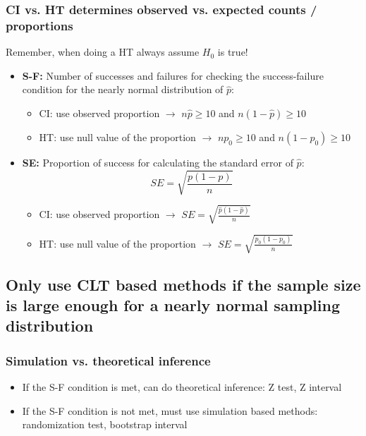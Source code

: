 \documentclass[11pt,containsverbatim,handout,xcolor=xelatex,dvipsnames,table]{beamer}
\begin{document}
\begin{frame}
\frametitle{CI vs. HT determines observed vs. expected counts / proportions}

Remember, when doing a HT always assume $H_0$ is true!
\pause

\begin{itemize}

\item \textbf{S-F:} Number of successes and failures for checking the success-failure condition for the 
nearly normal distribution of $\hat{p}$:
\pause
\begin{itemize}
\item CI: use observed proportion $\rightarrow$ $n\hat{p} \ge 10$ and $n(1 - \hat{p}) \ge 10$
\pause
\item HT: use null value of the proportion $\rightarrow$ $np_0 \ge 10$ and $n(1 - p_0) \ge 10$
\end{itemize}

\pause

\item \textbf{SE:} Proportion of success for calculating the standard error of $\hat{p}$: 
\[ SE = \sqrt{\frac{p(1-p)}{n}} \]
\pause
\vspace{-0.5cm}
\begin{itemize}
\item CI: use observed proportion $\rightarrow$ $SE = \sqrt{\frac{\hat{p}(1-\hat{p})}{n}}$
\pause
\item HT: use null value of the proportion $\rightarrow$ $SE = \sqrt{\frac{p_0(1-p_0)}{n}}$
\end{itemize}

\end{itemize}

\end{frame}


\subsection{Only use CLT based methods if the sample size is large enough for a nearly normal sampling distribution}
\label{mi4}


\begin{frame}
\frametitle{Simulation vs. theoretical inference}

\begin{itemize}

\item If the S-F condition is met, can do theoretical inference: Z test, Z interval

\item If the S-F condition is not met, must use simulation based methods: randomization test, bootstrap interval

\end{itemize}

\end{frame}
\end{document}
